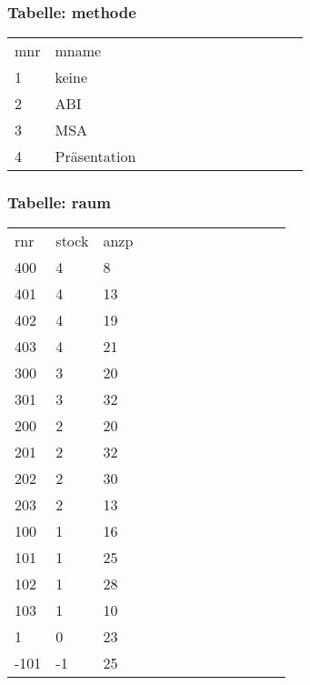 \documentclass[fleqn]{scrartcl}
\begin{document}
\subsubsection{Tabelle: methode}
\begin{tabular}{|l|l|l|l|l|l|l|l|l|l|l|l|l|}\toprule
\rowcolor{green!20}
\multicolumn{2}{|c|}{
methode
}\\\midrule
\rowcolor{yellow!30}mnr & mname  \\\midrule
1& keine  \\ 
2& ABI  \\ 
3& MSA  \\ 
4& Präsentation  \\ 
\bottomrule
\end{tabular}

\subsubsection{Tabelle: raum}
\begin{tabular}{|l|l|l|l|l|l|l|l|l|l|l|l|l|}\toprule
\rowcolor{green!20}
\multicolumn{3}{|c|}{
raum
}\\\midrule
\rowcolor{yellow!30}rnr & stock  & anzp  \\\midrule
400& 4 & 8  \\ 
401& 4 & 13  \\ 
402& 4 & 19  \\ 
403& 4 & 21  \\ 
300& 3 & 20  \\ 
301& 3 & 32  \\ 
200& 2 & 20  \\ 
201& 2 & 32  \\ 
202& 2 & 30  \\ 
203& 2 & 13  \\ 
100& 1 & 16  \\ 
101& 1 & 25  \\ 
102& 1 & 28  \\ 
103& 1 & 10  \\ 
1& 0 & 23  \\ 
-101& -1 & 25  \\ 
\bottomrule
\end{tabular}
\end{document}
